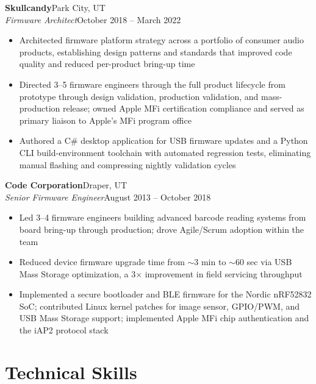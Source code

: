 \documentclass[10.5pt, letterpaper]{article}
\newcommand{\jobentry}[4]{%
  \noindent
  \textbf{\color{accent}#1}\hfill\textcolor{muted}{\small #2}\\
  \textit{#3}\hfill\textcolor{muted}{\small #4}%
}
\begin{document}
\jobentry{Skullcandy}{Park City, UT}{Firmware Architect}{October 2018 -- March 2022}
\begin{itemize}
  \item Architected firmware platform strategy across a portfolio of consumer audio
        products, establishing design patterns and standards that improved code quality
        and reduced per-product bring-up time
  \item Directed 3--5 firmware engineers through the full product lifecycle from
        prototype through design validation, production validation, and mass-production
        release; owned Apple MFi certification compliance and served as primary liaison
        to Apple's MFi program office
  \item Authored a C\# desktop application for USB firmware updates and a Python
        CLI build-environment toolchain with automated regression tests, eliminating
        manual flashing and compressing nightly validation cycles
\end{itemize}

\vspace{5pt}

\jobentry{Code Corporation}{Draper, UT}{Senior Firmware Engineer}{August 2013 -- October 2018}
\begin{itemize}
  \item Led 3--4 firmware engineers building advanced barcode reading systems from
        board bring-up through production; drove Agile/Scrum adoption within the team
  \item Reduced device firmware upgrade time from $\sim$3 min to $\sim$60 sec via USB
        Mass Storage optimization, a 3$\times$ improvement in field servicing throughput
  \item Implemented a secure bootloader and BLE firmware for the Nordic nRF52832 SoC;
        contributed Linux kernel patches for image sensor, GPIO/PWM, and USB Mass
        Storage support; implemented Apple MFi chip authentication and the iAP2
        protocol stack
\end{itemize}

\section{Technical Skills}
\end{document}
